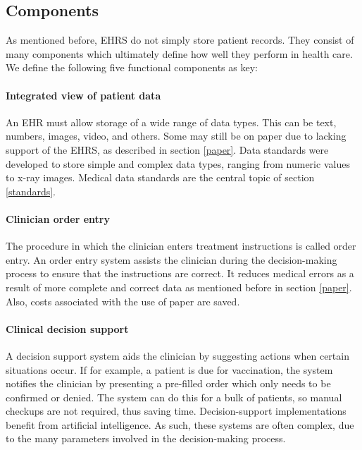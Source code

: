     \subsection{Components}\label{components}

    As mentioned before, EHRS do not simply store patient records. They consist of many components which ultimately define how well they perform in health care. We define the following five functional components as key\cite{Shortliffe2014}:

    \paragraph{Integrated view of patient data} An EHR must allow storage of a wide range of data types. This can be text, numbers, images, video, and others. Some may still be on paper due to lacking support of the EHRS, as described in section \ref{paper}. Data standards were developed to store simple and complex data types, ranging from numeric values to x-ray images. Medical data standards are the central topic of section \ref{standards}. %

    \paragraph{Clinician order entry} The procedure in which the clinician enters treatment instructions is called order entry. An order entry system assists the clinician during the decision-making process to ensure that the instructions are correct. It reduces medical errors as a result of more complete and correct data as mentioned before in section \ref{paper}. Also, costs associated with the use of paper are saved. %

    \paragraph{Clinical decision support} A decision support system aids the clinician by suggesting actions when certain situations occur. If for example, a patient is due for vaccination, the system notifies the clinician by presenting a pre-filled order which only needs to be confirmed or denied. The system can do this for a bulk of patients, so manual checkups are not required, thus saving time. Decision-support implementations benefit from artificial intelligence. As such, these systems are often complex, due to the many parameters involved in the decision-making process.

